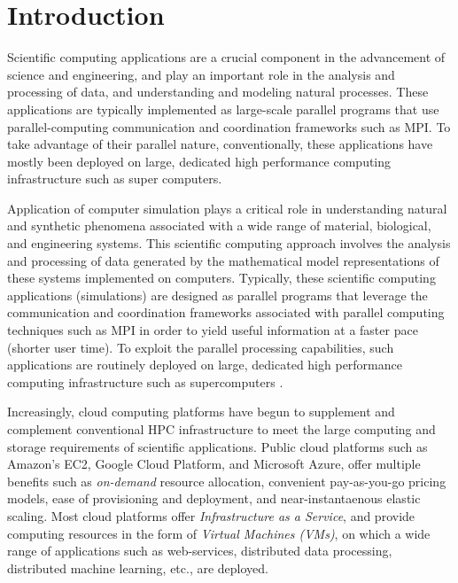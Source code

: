 \section{Introduction}


Scientific computing applications are a crucial component in the advancement of science and engineering, and play an important role in the analysis and processing of data, and understanding and modeling natural processes. 
These applications are typically implemented as large-scale parallel programs that use parallel-computing communication and coordination frameworks such as MPI.
To take advantage of their parallel nature, conventionally, these applications have mostly been deployed on large, dedicated high performance computing infrastructure such as super computers. 

\vikram
{
Application of computer simulation plays a critical role in understanding natural and synthetic phenomena associated with a wide range of material, biological, and engineering systems. This scientific computing approach involves the analysis and processing of data generated by the mathematical model representations of these systems implemented on computers. Typically, these scientific computing applications (simulations) are designed as parallel programs that leverage the communication and coordination frameworks associated with parallel computing techniques such as MPI in order to yield useful information at a faster pace (shorter user time). To exploit the parallel processing capabilities, such applications are routinely deployed on large, dedicated high performance computing infrastructure such as supercomputers \cite{bigred2,amherst,etc.}.
}



Increasingly, cloud computing platforms have begun to supplement  and complement  conventional HPC infrastructure  to meet the large computing and storage requirements of scientific applications. Public cloud platforms such as Amazon's EC2, Google Cloud Platform, and Microsoft Azure, offer multiple benefits such as \emph{on-demand} resource allocation, convenient pay-as-you-go pricing models, ease of provisioning and deployment, and near-instantaenous elastic scaling.
Most cloud platforms offer \emph{Infrastructure as a Service}, and provide computing resources in the form of \emph{Virtual Machines (VMs)}, on which a wide range of  applications such as web-services, distributed data processing, distributed machine learning, etc., are deployed. 

